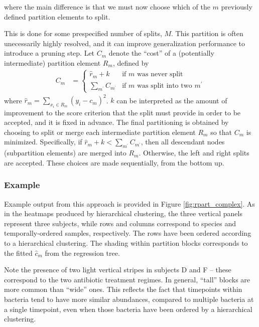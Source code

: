 \documentclass[14pt]{extarticle}
\begin{document}
where the main difference is that we must now choose which of the $m$ previously
defined partition elements to split.

This is done for some prespecified number of splits, $M$. This partition is
often unecessarily highly resolved, and it can improve generalization
performance to introduce a pruning step. Let $C_{m}$ denote the ``cost'' of a
(potentially intermediate) partition element $R_{m}$, defined by
\begin{align*}
  C_{m} &= \begin{cases}
    \hat{r}_{m} + k & \text{if $m$ was never split} \\
    \sum_{m^\prime} C_{m^{\prime}} & \text{if $m$ was split into two $m^{\prime}$}
    \end{cases}
\end{align*}
where $\hat{r}_{m} = \sum_{x_{i} \in R_{m}} \left(y_{i} - c_{m}\right)^{2}$. $k$
can be interpreted as the amount of improvement to the score criterion that the
split must provide in order to be accepted, and it is fixed in advance. The
final partitioning is obtained by choosing to split or merge each intermediate
partition element $R_m$ so that $C_{m}$ is minimized. Specifically, if
$\hat{r}_{m} + k < \sum_{m^{\prime}} C_{m^{\prime}}$, then all descendant nodes
(subpartition elements) are merged into $R_{m}$. Otherwise, the left and right
splits are accepted. These choices are made sequentially, from the bottom up.

\subsubsection{Example}
\label{subsubcart_example}

Example output from this approach is provided in Figure \ref{fig:rpart_complex}.
As in the heatmaps produced by hierarchical clustering, the three vertical
panels represent three subjects, while rows and columns correspond to species
and temporally-ordered samples, respectively. The rows have been ordered
according to a hierarchical clustering. The shading within partition blocks
corresponds to the fitted $\hat{c}_{m}$ from the regression tree.

Note the presence of two light vertical stripes in subjects D and F -- these
correspond to the two antibiotic treatment regimes. In general, ``tall'' blocks
are more common than ``wide'' ones. This reflects the fact that timepoints
within bacteria tend to have more similar abundances, compared to multiple
bacteria at a single timepoint, even when those bacteria have been ordered by a
hierarchical clustering.
\end{document}
